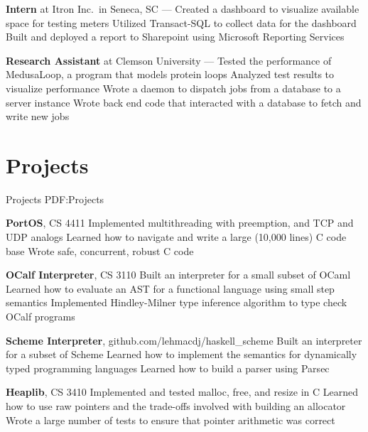 \documentclass[letterpaper,10pt,oneside]{simpleresume}
\begin{document}
\begin{minipage}[t][0pt]{\linewidth}
\begin{body}
\textbf{Intern} at Itron Inc.\ in Seneca, SC
\hfill
{} --- 
\BulletItem%
Created a dashboard to visualize available space for testing meters
\BulletItem%
Utilized Transact-SQL to collect data for the dashboard
\BulletItem%
Built and deployed a report to Sharepoint using Microsoft Reporting Services

\textbf{Research Assistant} at Clemson University
\hfill
{} --- 
\BulletItem%
Tested the performance of MedusaLoop, a program that models protein loops
\BulletItem%
Analyzed test results to visualize performance
\BulletItem%
Wrote a daemon to dispatch jobs from a database to a server instance
\BulletItem%
Wrote back end code that interacted with a database to fetch and write new jobs

\section%
{Projects}
{Projects}
{PDF:Projects}

\textbf{PortOS}, CS 4411
\BulletItem%
Implemented multithreading with preemption, and TCP and UDP analogs
\BulletItem%
Learned how to navigate and write a large (10,000 lines) C code base
\BulletItem%
Wrote safe, concurrent, robust C code
\GapNoBreak%

\textbf{OCalf Interpreter}, CS 3110
\BulletItem%
Built an interpreter for a small subset of OCaml
\BulletItem%
Learned how to evaluate an AST for a functional language using small step
semantics
\BulletItem%
Implemented Hindley-Milner type inference algorithm to type check OCalf programs
\GapNoBreak%

\textbf{Scheme Interpreter}, github.com/lehmacdj/haskell\_scheme
\BulletItem%
Built an interpreter for a subset of Scheme
\BulletItem%
Learned how to implement the semantics for dynamically typed programming
languages
\BulletItem%
Learned how to build a parser using Parsec
\GapNoBreak%

\textbf{Heaplib}, CS 3410
\BulletItem%
Implemented and tested malloc, free, and resize in C
\BulletItem%
Learned how to use raw pointers and the trade-offs involved with building
an allocator
\BulletItem%
Wrote a large number of tests to ensure that pointer arithmetic was correct
\GapNoBreak%



\end{body}
\end{minipage}
\end{document}
